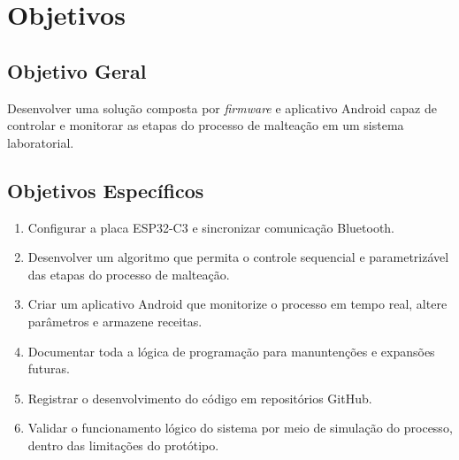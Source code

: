 \chapter[Objetivos]{Objetivos}

\section{Objetivo Geral}

Desenvolver uma solução composta por \textit{firmware} e aplicativo Android capaz de controlar e monitorar as etapas do processo de malteação em um sistema laboratorial.

\section{Objetivos Específicos}

\begin{enumerate}
    \item Configurar a placa ESP32-C3 e sincronizar comunicação Bluetooth.
    \item Desenvolver um algoritmo que permita o controle sequencial e parametrizável das etapas do processo de malteação.
    \item Criar um aplicativo Android que monitorize o processo em tempo real, altere parâmetros e armazene receitas.
    \item Documentar toda a lógica de programação para manuntenções e expansões futuras.
    \item Registrar o desenvolvimento do código em repositórios GitHub.
    \item Validar o funcionamento lógico do sistema por meio de simulação do processo, dentro das limitações do protótipo.
\end{enumerate}